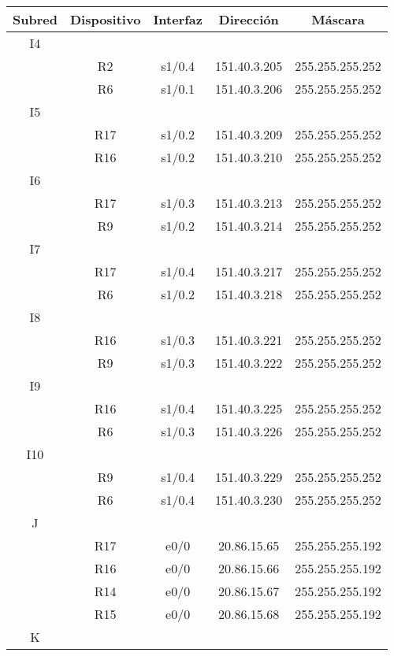 \documentclass[12pt,a4paper,spanish]{article}
\begin{document}
\begin{tabular}{|c|c|c|c|c|}
	\hline
	Subred & Dispositivo & Interfaz & Dirección & Máscara\\
	\hline
	\hline
	I4 & & & & \\
	\hline
	  & R2 & s1/0.4 & 151.40.3.205 & 255.255.255.252 \\
	\hline
	  & R6 & s1/0.1 & 151.40.3.206 & 255.255.255.252 \\
	\hline
	\hline
	I5 & & & & \\
	\hline
	  & R17 & s1/0.2 & 151.40.3.209 & 255.255.255.252 \\
	\hline
	  & R16 & s1/0.2 & 151.40.3.210 & 255.255.255.252 \\
	\hline
	\hline
	I6 & & & & \\
	\hline
	  & R17 & s1/0.3 & 151.40.3.213 & 255.255.255.252 \\
	\hline
	  & R9 & s1/0.2 & 151.40.3.214 & 255.255.255.252 \\
	\hline
	\hline
	I7 & & & & \\
	\hline
	  & R17 & s1/0.4 & 151.40.3.217 & 255.255.255.252 \\
	\hline
	  & R6 & s1/0.2 & 151.40.3.218 & 255.255.255.252 \\
	\hline
	\hline
	I8 & & & & \\
	\hline
	  & R16 & s1/0.3 & 151.40.3.221 & 255.255.255.252 \\
	\hline
	  & R9 & s1/0.3 & 151.40.3.222 & 255.255.255.252 \\
	\hline
	\hline
	I9 & & & & \\
	\hline
	  & R16 & s1/0.4 & 151.40.3.225 & 255.255.255.252 \\
	\hline
	  & R6 & s1/0.3 & 151.40.3.226 & 255.255.255.252 \\
	\hline
	\hline
	I10 & & & & \\
	\hline
	  & R9 & s1/0.4 & 151.40.3.229 & 255.255.255.252 \\
	\hline
	  & R6 & s1/0.4 & 151.40.3.230 & 255.255.255.252 \\
	\hline
	\hline
	J & & & & \\
	\hline
	  & R17 & e0/0 & 20.86.15.65 & 255.255.255.192 \\
	\hline
	  & R16 & e0/0 & 20.86.15.66 & 255.255.255.192 \\
	\hline
	  & R14 & e0/0 & 20.86.15.67 & 255.255.255.192 \\
	\hline
	  & R15 & e0/0 & 20.86.15.68 & 255.255.255.192 \\
	\hline
	\hline
	K & & & & \\

\end{tabular}
\end{document}
